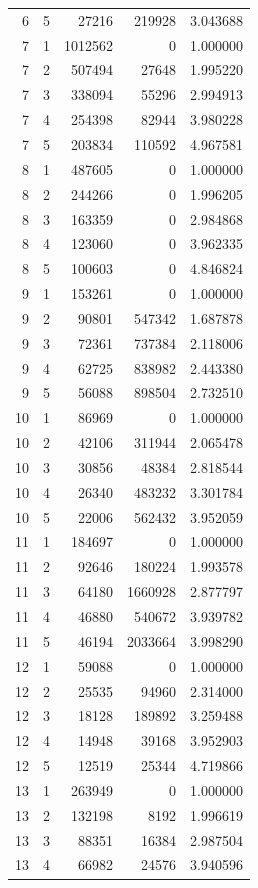 \begin{longtable}{rrrrr}
6 & 5 & 27216 & 219928 & 3.043688 \\
7 & 1 & 1012562 & 0 & 1.000000 \\
7 & 2 & 507494 & 27648 & 1.995220 \\
7 & 3 & 338094 & 55296 & 2.994913 \\
7 & 4 & 254398 & 82944 & 3.980228 \\
7 & 5 & 203834 & 110592 & 4.967581 \\
8 & 1 & 487605 & 0 & 1.000000 \\
8 & 2 & 244266 & 0 & 1.996205 \\
8 & 3 & 163359 & 0 & 2.984868 \\
8 & 4 & 123060 & 0 & 3.962335 \\
8 & 5 & 100603 & 0 & 4.846824 \\
9 & 1 & 153261 & 0 & 1.000000 \\
9 & 2 & 90801 & 547342 & 1.687878 \\
9 & 3 & 72361 & 737384 & 2.118006 \\
9 & 4 & 62725 & 838982 & 2.443380 \\
9 & 5 & 56088 & 898504 & 2.732510 \\
10 & 1 & 86969 & 0 & 1.000000 \\
10 & 2 & 42106 & 311944 & 2.065478 \\
10 & 3 & 30856 & 48384 & 2.818544 \\
10 & 4 & 26340 & 483232 & 3.301784 \\
10 & 5 & 22006 & 562432 & 3.952059 \\
11 & 1 & 184697 & 0 & 1.000000 \\
11 & 2 & 92646 & 180224 & 1.993578 \\
11 & 3 & 64180 & 1660928 & 2.877797 \\
11 & 4 & 46880 & 540672 & 3.939782 \\
11 & 5 & 46194 & 2033664 & 3.998290 \\
12 & 1 & 59088 & 0 & 1.000000 \\
12 & 2 & 25535 & 94960 & 2.314000 \\
12 & 3 & 18128 & 189892 & 3.259488 \\
12 & 4 & 14948 & 39168 & 3.952903 \\
12 & 5 & 12519 & 25344 & 4.719866 \\
13 & 1 & 263949 & 0 & 1.000000 \\
13 & 2 & 132198 & 8192 & 1.996619 \\
13 & 3 & 88351 & 16384 & 2.987504 \\
13 & 4 & 66982 & 24576 & 3.940596 \\

\end{longtable}
